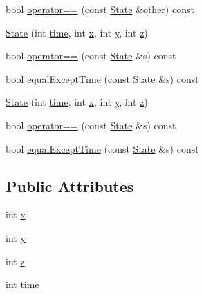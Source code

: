 \begin{DoxyCompactItemize}
\item 
bool \hyperlink{struct_state_ab98d310aaceb21737346521c5bc6fc6c}{operator==} (const \hyperlink{struct_state}{State} \&other) const
\item 
\hyperlink{struct_state_acd7182e04da1e5c712fdda9a0dd329bd}{State} (int \hyperlink{struct_state_a66c39d91e41d0f477758d00af0300a8a}{time}, int \hyperlink{struct_state_aafa13753373691d8ea3327717c61ef32}{x}, int \hyperlink{struct_state_a5dcf4a949618c21b85eb39ad41dfb08e}{y}, int \hyperlink{struct_state_afbfffdf9a289cde788f99498adf1a0e5}{z})
\item 
bool \hyperlink{struct_state_ad7c923d78b138998c9f9f9674fbdd93a}{operator==} (const \hyperlink{struct_state}{State} \&s) const
\item 
bool \hyperlink{struct_state_a6d429325c836ad81fd1d95eec0051663}{equal\+Except\+Time} (const \hyperlink{struct_state}{State} \&s) const
\item 
\hyperlink{struct_state_acd7182e04da1e5c712fdda9a0dd329bd}{State} (int \hyperlink{struct_state_a66c39d91e41d0f477758d00af0300a8a}{time}, int \hyperlink{struct_state_aafa13753373691d8ea3327717c61ef32}{x}, int \hyperlink{struct_state_a5dcf4a949618c21b85eb39ad41dfb08e}{y}, int \hyperlink{struct_state_afbfffdf9a289cde788f99498adf1a0e5}{z})
\item 
bool \hyperlink{struct_state_ad7c923d78b138998c9f9f9674fbdd93a}{operator==} (const \hyperlink{struct_state}{State} \&s) const
\item 
bool \hyperlink{struct_state_a6d429325c836ad81fd1d95eec0051663}{equal\+Except\+Time} (const \hyperlink{struct_state}{State} \&s) const
\end{DoxyCompactItemize}
\subsection*{Public Attributes}
\begin{DoxyCompactItemize}
\item 
int \hyperlink{struct_state_aafa13753373691d8ea3327717c61ef32}{x}
\item 
int \hyperlink{struct_state_a5dcf4a949618c21b85eb39ad41dfb08e}{y}
\item 
int \hyperlink{struct_state_afbfffdf9a289cde788f99498adf1a0e5}{z}
\item 
int \hyperlink{struct_state_a66c39d91e41d0f477758d00af0300a8a}{time}
\end{DoxyCompactItemize}
